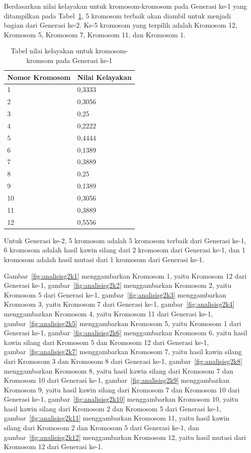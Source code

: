 \clearpage

Berdasarkan nilai kelayakan untuk kromosom-kromosom pada Generasi ke-1 yang ditampilkan pada Tabel~\ref{tab:analisishg2}, 5 kromosom terbaik akan diambil untuk menjadi bagian dari Generasi ke-2. Ke-5 kromosom yang terpilih adalah Kromosom 12, Kromosom 5, Kromosom 7, Kromosom 11, dan Kromosom 1.

\begin{table}
\centering
\captionsetup{justification=centering}
\begin{tabular}{| l | l |}
\hline
Nomor Kromosom & Nilai Kelayakan \\
\hline \hline
1 & 0,3333 \\
\hline
2 & 0,3056 \\
\hline
3 & 0,25 \\
\hline
4 & 0,2222 \\
\hline
5 & 0,4444 \\
\hline
6 & 0,1389 \\
\hline
7 & 0,3889 \\
\hline
8 & 0,25 \\
\hline
9 & 0,1389 \\
\hline
10 & 0,3056 \\
\hline
11 & 0,3889 \\
\hline
12 & 0,5556 \\
\hline
\end{tabular}
\caption[Tabel nilai kelayakan untuk kromosom-kromsom pada Generasi ke-1]{Tabel nilai kelayakan untuk kromosom-kromsom pada Generasi ke-1}
\label{tab:analisishg2}
\end{table}

Untuk Generasi ke-2, 5 kromosom adalah 5 kromosom terbaik dari Generasi ke-1, 6 kromosom adalah hasil kawin silang dari 2 kromosom dari Generasi ke-1, dan 1 kromosom adalah hasil mutasi dari 1 kromosom dari Generasi ke-1.

Gambar~\ref{fig:analisisg2k1} menggambarkan Kromosom 1, yaitu Kromosom 12 dari Generasi ke-1, gambar~\ref{fig:analisisg2k2} menggambarkan Kromosom 2, yaitu Kromosom 5 dari Generasi ke-1, gambar~\ref{fig:analisisg2k3} menggambarkan Kromosom 3, yaitu Kromosom 7 dari Generasi ke-1, gambar~\ref{fig:analisisg2k4} menggambarkan Kromosom 4, yaitu Kromosom 11 dari Generasi ke-1, gambar~\ref{fig:analisisg2k5} menggambarkan Kromosom 5, yaitu Kromosom 1 dari Generasi ke-1, gambar~\ref{fig:analisisg2k6} menggambarkan Kromosom 6, yaitu hasil kawin silang dari Kromosom 5 dan Kromosom 12 dari Generasi ke-1, gambar~\ref{fig:analisisg2k7} menggambarkan Kromosom 7, yaitu hasil kawin silang dari Kromosom 3 dan Kromosom 8 dari Generasi ke-1, gambar~\ref{fig:analisisg2k8} menggambarkan Kromosom 8, yaitu hasil kawin silang dari Kromosom 7 dan Kromosom 10 dari Generasi ke-1, gambar~\ref{fig:analisisg2k9} menggambarkan Kromosom 9, yaitu hasil kawin silang dari Kromosom 7 dan Kromosom 10 dari Generasi ke-1, gambar~\ref{fig:analisisg2k10} menggambarkan Kromosom 10, yaitu hasil kawin silang dari Kromosom 2 dan Kromosom 5 dari Generasi ke-1, gambar~\ref{fig:analisisg2k11} menggambarkan Kromosom 11, yaitu hasil kawin silang dari Kromosom 2 dan Kromosom 5 dari Generasi ke-1, dan gambar~\ref{fig:analisisg2k12} menggambarkan Kromosom 12, yaitu hasil mutasi dari Kromosom 12 dari Generasi ke-1.


